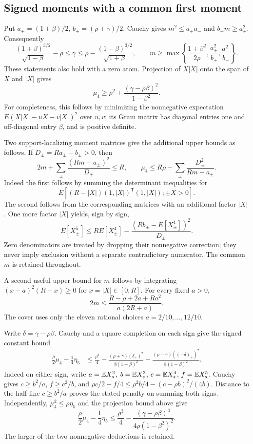 \subsection{Signed moments with a common first moment}
Put $a_\pm=(1\pm\beta)/2$, $b_\pm=(\rho\pm\gamma)/2$.
Cauchy gives $m^2\le a_+a_-$ and $b_\pm m\ge a_\pm^2$.
Consequently
\[
 \frac{(1+\beta)^{3/2}}{\sqrt{1-\beta}}-\rho
 \le\gamma\le
 \rho-\frac{(1-\beta)^{3/2}}{\sqrt{1+\beta}},\qquad
 m\ge\max\left\{\frac{1+\beta^2}{2\rho},
                  \frac{a_+^2}{b_+},\frac{a_-^2}{b_-}\right\}.
\]
These statements also hold with a zero atom. Projection of $X|X|$ onto
the span of $X$ and $|X|$ gives
\[
 \mu_4\ge\rho^2+\frac{(\gamma-\rho\beta)^2}{1-\beta^2}.
\]
For completeness, this follows by minimizing the nonnegative expectation
$E(X|X|-uX-v|X|)^2$ over $u,v$; its Gram matrix has diagonal entries
one and off-diagonal entry $\beta$, and is positive definite.

Two support-localizing moment matrices give the additional upper bounds
as follows. If
$D_\pm=Ra_\pm-b_\pm>0$, then
\[
 2m+\sum_\pm\frac{(Rm-a_\pm)^2}{D_\pm}\le R,
 \qquad
 \mu_4\le R\rho-\sum_\pm\frac{D_\pm^2}{Rm-a_\pm}.
\]
Indeed the first follows by summing the determinant inequalities for
\[E[(R-|X|)(1,|X|)^{\mathsf T}(1,|X|);\pm X>0].\]
The second follows from the corresponding matrices with an additional
factor $|X|$. One more factor $|X|$ yields, sign by sign,
\[
 E[X_\pm^5]\le R E[X_\pm^4]
 -\frac{(Rb_\pm-E[X_\pm^4])^2}{D_\pm}.
\]
Zero denominators are treated by dropping their nonnegative correction;
they never imply exclusion without a separate contradictory numerator.
The common $m$ is retained throughout.

A second useful upper bound for $m$ follows by integrating
$(x-a)^2(R-x)\ge0$ for $x=|X|\in[0,R]$. For every fixed $a>0$,
\[
 2m\le\frac{R-\rho+2a+Ra^2}{a(2R+a)}.
\]
The cover uses only the eleven rational choices $a=2/10,\ldots,12/10$.

Write $\delta=\gamma-\rho\beta$. Cauchy and a square completion on
each sign give the signed constant bound
\begin{align*}
 \frac\rho2\mu_4-\frac14\eta_5
 &\le\frac{\rho^3}{4}
 -\frac{(\rho+\gamma)(\delta_+)^2}{8(1+\beta)^2}
 -\frac{(\rho-\gamma)((-\delta)_+)^2}{8(1-\beta)^2}.
\end{align*}
Indeed on either sign, write $a=\mathbb E X_s^2$, $b=\mathbb E X_s^3$,
$c=\mathbb E X_s^4$, $f=\mathbb E X_s^5$. Cauchy gives $c\ge b^2/a$,
$f\ge c^2/b$, and
$\rho c/2-f/4\le\rho^2b/4-(c-\rho b)^2/(4b)$.
Distance to the half-line $c\ge b^2/a$ proves the stated penalty
on summing both signs. Independently,
$\mu_4^2\le\rho\eta_5$ and the projection bound above give
\[
 \frac\rho2\mu_4-\frac14\eta_5
 \le\frac{\rho^3}{4}
 -\frac{(\gamma-\rho\beta)^4}{4\rho(1-\beta^2)^2}.
\]
The larger of the two nonnegative deductions is retained.

